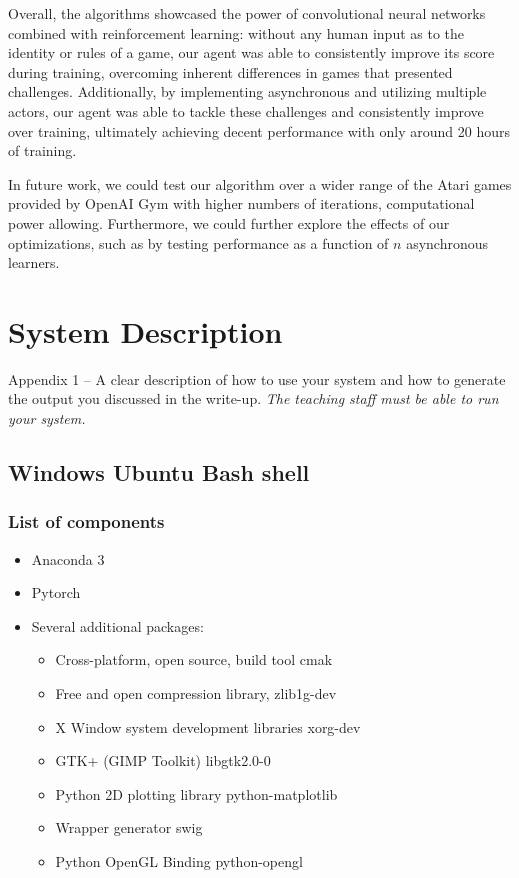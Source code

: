 \documentclass[11pt]{article}
\begin{document}
Overall, the algorithms showcased the power of convolutional neural networks combined with reinforcement learning: without any human input as to the identity or rules of a game, our agent was able to consistently improve its score during training, overcoming inherent differences in games that presented challenges. Additionally, by implementing asynchronous and utilizing multiple actors, our agent was able to tackle these challenges and consistently improve over training, ultimately achieving decent performance with only around 20 hours of training.

In future work, we could test our algorithm over a wider range of the Atari games provided by OpenAI Gym with higher numbers of iterations, computational power allowing. Furthermore, we could further explore the effects of our optimizations, such as by testing performance as a function of $n$ asynchronous learners.

\appendix

\section{System Description}

 Appendix 1 – A clear description of how to use your system and how to generate the output you discussed in the write-up. \emph{The teaching staff must be able to run your system.}
 \subsection*{Windows Ubuntu Bash shell}
 \subsubsection*{List of components}
 \begin{itemize}
  \item Anaconda 3
  \item Pytorch 
  \item Several additional packages: 
  \begin{itemize}
      \item Cross-platform, open source, build tool cmak
      \item Free and open compression library, zlib1g-dev 
      \item X Window system development libraries xorg-dev
      \item GTK+ (GIMP Toolkit) libgtk2.0-0
      \item Python 2D plotting library python-matplotlib
      \item Wrapper generator swig
      \item Python OpenGL Binding python-opengl
  \end{itemize}
\end{itemize}
\end{document}
